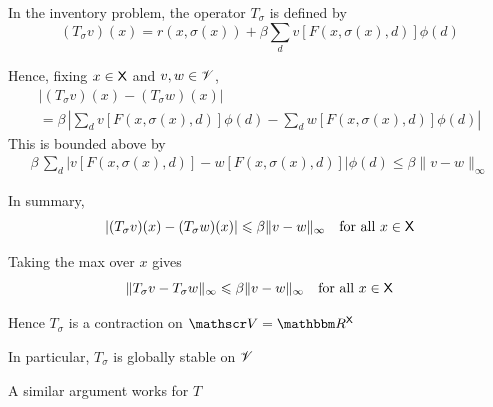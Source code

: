\begin{frame}
    
    \Eg In the inventory problem, the operator $T_\sigma$ is defined by 
    \begin{equation*}
        (T_\sigma v)(x)
        = r(x, \sigma(x))
                + \beta
                \sum_d v [F(x, \sigma(x), d) ] \phi(d)
    \end{equation*}

    Hence, fixing $x \in \mathsf X$ and $v, w \in \mathscr V$,
    \begin{multline*}
        |(T_\sigma v)(x) -(T_\sigma w)(x)|
        \\ 
        =
        \beta \,
        \left| 
            \sum_d v [F(x, \sigma(x), d) ] \phi(d)
            - \sum_d w [F(x, \sigma(x), d) ] \phi(d)
        \right|
    \end{multline*}
    This is bounded above by 
    \begin{align*}
        \beta \,
        \sum_d
        \left| 
            v [F(x, \sigma(x), d) ]
            -w [F(x, \sigma(x), d) ]
        \right| \phi(d)
        \leq \beta \| v - w\|_\infty
    \end{align*}

\end{frame}


\begin{frame}

    In summary,
    \begin{equation*}
        |(T_\sigma v)(x) -(T_\sigma w)(x)|
        \leqslant \beta \| v - w\|_\infty
        \quad \text{for all } x \in \mathsf X
    \end{equation*}
    
        \vspace{0.5em}
    Taking the max over $x$ gives
    \begin{equation*}
        \|T_\sigma v -T_\sigma w \|_\infty
        \leqslant \beta \| v - w\|_\infty
        \quad \text{for all } x \in \mathsf X
    \end{equation*}


        \vspace{0.5em}
    Hence $T_\sigma$ is a contraction on $\vV = \RR^\Xsf$

        \vspace{0.5em}
    In particular, $T_\sigma$ is globally stable on $\mathscr V$

        \vspace{0.5em}
        \vspace{0.5em}
    A similar argument works for $T$

\end{frame}


